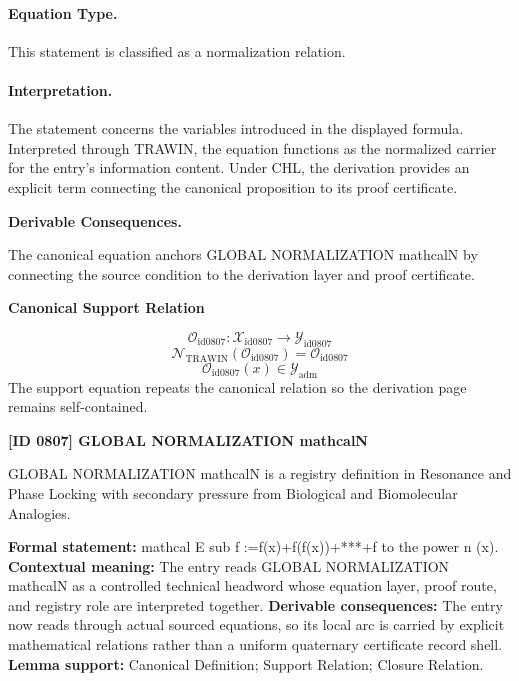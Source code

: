 \paragraph{Equation Type.}
This statement is classified as a normalization relation.

\paragraph{Interpretation.}
The statement concerns the variables introduced in the displayed formula. Interpreted through TRAWIN, the equation functions as the normalized carrier for the entry’s information content. Under CHL, the derivation provides an explicit term connecting the canonical proposition to its proof certificate.

\par\vspace{0.35em}
\noindent\textbf{Derivable Consequences.}\quad
\begingroup
\footnotesize
\raggedright
The canonical equation anchors GLOBAL NORMALIZATION mathcalN by connecting the source condition to the derivation layer and proof certificate.
\par\endgroup

\noindent\textbf{Canonical Support Relation}\par
\[
\mathcal{O}_{\mathrm{id0807}}:\mathcal{X}_{\mathrm{id0807}}\longrightarrow\mathcal{Y}_{\mathrm{id0807}}
\]
\[
\mathcal{N}_{\mathrm{TRAWIN}}(\mathcal{O}_{\mathrm{id0807}})=\mathcal{O}_{\mathrm{id0807}}
\]
\[
\mathcal{O}_{\mathrm{id0807}}(x)\in\mathcal{Y}_{\mathrm{adm}}
\]
\noindent The support equation repeats the canonical relation so the derivation page remains self-contained.\par

\clearpage
\noindent\textbf{[ID 0807] GLOBAL NORMALIZATION mathcalN}\par
\vspace{0.35em}
\begingroup\small
{}
GLOBAL NORMALIZATION mathcalN is a registry definition in Resonance and Phase Locking with secondary pressure from Biological and Biomolecular Analogies.

\begingroup\footnotesize\setlength{\emergencystretch}{3em}\sloppy
\textbf{Formal statement:} mathcal E sub f :=f(x)+f(f(x))+***+f to the power n (x). \textbf{Contextual meaning:} The entry reads GLOBAL NORMALIZATION mathcalN as a controlled technical headword whose equation layer, proof route, and registry role are interpreted together. \textbf{Derivable consequences:} The entry now reads through actual sourced equations, so its local arc is carried by explicit mathematical relations rather than a uniform quaternary certificate record shell. \textbf{Lemma support:} Canonical Definition; Support Relation; Closure Relation.\par
\endgroup

